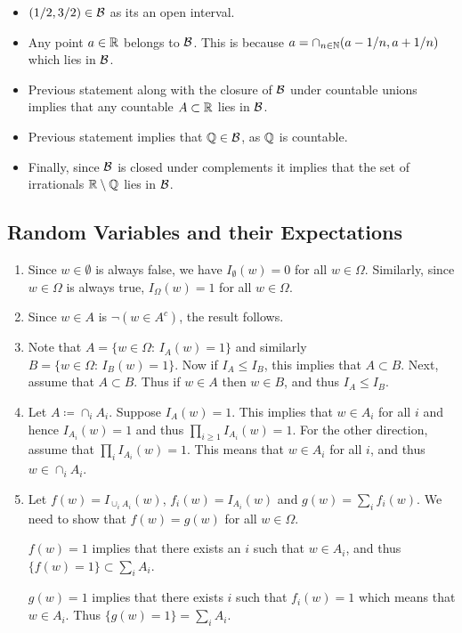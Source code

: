\begin{itemize}
    \item $(1/2, 3/2) \in\mathcal{B}$ as its an open interval. 
    \item Any point $a \in \mathbb{R}$ belongs to $\mathcal{B}$. This is because $a = \cap_{ n \in \mathbb{N}} (a-1/n, a+1/n)$ which lies in $\mathcal{B}$. 
    \item Previous statement along with the closure of $\mathcal{B}$ under countable unions implies that any countable $A \subset \mathbb{R}$ lies in $\mathcal{B}$. 
    
    \item Previous statement implies that $\mathbb{Q} \in \mathcal{B}$, as $\mathbb{Q}$ is countable. 
    
    \item Finally, since $\mathcal{B}$ is closed under complements it implies that the set of irrationals $\mathbb{R} \setminus \mathbb{Q}$ lies in $\mathcal{B}$. 
\end{itemize}

\subsection{Random Variables and their Expectations}
\label{subsec:random_variables}

\begin{enumerate}[label=(\alph*)]
\item Since $w \in \emptyset$ is always false, we have $I_\emptyset(w)=0$ for all $w \in \Omega$. Similarly, since $w\in \Omega$ is always true, $I_\Omega(w) = 1$ for all $w\in \Omega$. 

\item Since $w \in A$ is $\neg (w \in A^c)$, the result follows. 
\item Note that $A = \{w \in \Omega:\, I_A(w)=1\}$ and similarly $B = \{w \in \Omega:\, I_B(w)=1\}$. Now if $I_A\leq I_B$, this implies that $A \subset B$. Next, assume that $A \subset B$. Thus if  $w \in A$ then $w \in B$, and thus $I_A \leq I_B$. 

\item Let $A \coloneqq \cap_i A_i$. Suppose $I_A(w) = 1$. This implies that $w \in A_i$ for all $i$ and hence $I_{A_i}(w) = 1$ and thus $\prod_{i \geq 1} I_{A_i}(w)=1$. For the other direction, assume that $\prod_i I_{A_i}(w)=1$. This means that $w \in A_i$ for all $i$, and thus $w \in \cap_i A_i$. 

\item Let $f(w) = I_{\cup_iA_i}(w)$,  $f_i(w) = I_{A_i}(w)$ and $g(w) = \sum_i f_i(w)$. We need to show that $f(w) = g(w)$ for all $w \in \Omega$. 

$f(w)=1$ implies that there exists an $i$ such that $w \in A_i$, and thus $\{f(w)=1\} \subset \sum_i A_i$. 

$g(w)=1$ implies that there exists $i$ such that $f_i(w)=1$ which means that $w \in A_i$. Thus $\{g(w)=1\} = \sum_i A_i$. 
\end{enumerate}

